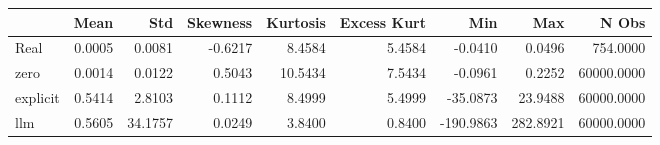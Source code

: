 \begin{tabular}{lrrrrrrrr}
\toprule
 & Mean & Std & Skewness & Kurtosis & Excess Kurt & Min & Max & N Obs \\
\midrule
Real & 0.0005 & 0.0081 & -0.6217 & 8.4584 & 5.4584 & -0.0410 & 0.0496 & 754.0000 \\
zero & 0.0014 & 0.0122 & 0.5043 & 10.5434 & 7.5434 & -0.0961 & 0.2252 & 60000.0000 \\
explicit & 0.5414 & 2.8103 & 0.1112 & 8.4999 & 5.4999 & -35.0873 & 23.9488 & 60000.0000 \\
llm & 0.5605 & 34.1757 & 0.0249 & 3.8400 & 0.8400 & -190.9863 & 282.8921 & 60000.0000 \\
\bottomrule
\end{tabular}
